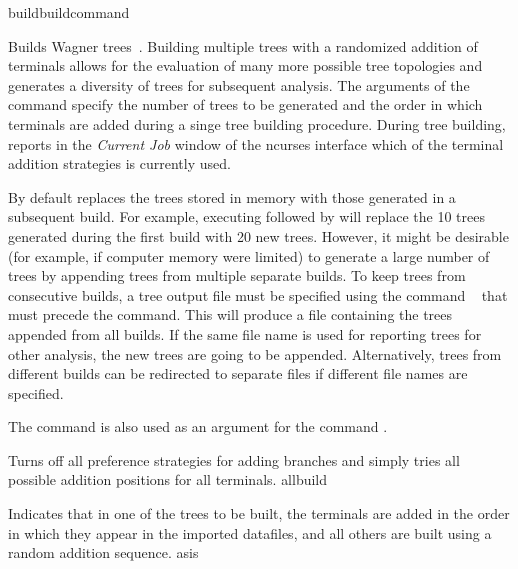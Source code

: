 \begin{command}{build}{buildcommand}

	
 	\begin{poydescription}
        Builds Wagner trees~\cite{farris1970}. Building multiple trees with a randomized addition of terminals allows for
        the evaluation of many more possible tree topologies and generates a
        diversity of trees for subsequent analysis. The arguments of the command
         specify the number of trees to be generated and
        the order in which terminals are added during a singe tree building procedure. During tree
        building, \poy reports in the \emph{Current Job} window of the ncurses interface
        which of the terminal addition strategies is currently used.
        

        By default \poy replaces the trees stored in memory with those generated
        in a subsequent build. For example, executing 
        followed by  will replace the 10 trees generated
        during the first build with 20 new trees. However, it might be desirable
        (for example, if computer memory were limited) to generate a large number of trees by
        appending trees from multiple separate builds. To keep trees from consecutive
        builds, a tree output file must be specified using the command ~ that must 
        precede the  command. This will produce a file
        containing the trees appended from all builds. If the same file name is used for reporting
         trees for other analysis, the new trees are going to be appended. Alternatively, trees from different
        builds can be redirected to separate files if different file names are specified.
        
        The command  is also used as
        an argument for the command .
   	\end{poydescription}

	\begin{arguments}

            {Turns off all preference strategies for adding branches
            and simply tries all possible addition positions for
            all terminals.}
            {allbuild}

            {Indicates that in one of the trees to be built, the terminals are
            added in the order in which they appear in the imported datafiles,
            and all others are built using a random addition sequence.}
            {asis}


\end{arguments}
\end{command}
